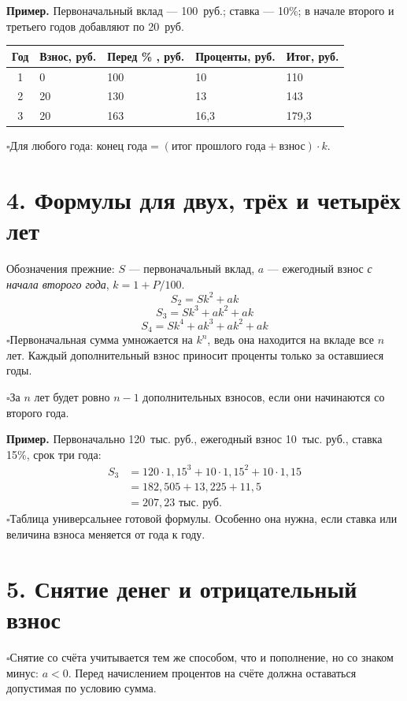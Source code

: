 \documentclass[a4paper,12pt]{article}
\newcommand{\checkitem}[1]{\noindent\(\square\)\enspace #1\par}
\newcommand{\smallrule}{\par\vspace{.15em}{\color{lightline}\rule{\linewidth}{.35pt}}\vspace{.15em}}
\begin{document}
\textbf{Пример.} Первоначальный вклад --- 100~руб.; ставка --- 10\%; в начале второго и третьего годов добавляют по 20~руб.
\begin{center}
\renewcommand{\arraystretch}{1.35}
\begin{tabularx}{\linewidth}{@{}cXXXX@{}}
\toprule
\textbf{Год} & \textbf{Взнос, руб.} & \textbf{Перед \% , руб.} & \textbf{Проценты, руб.} & \textbf{Итог, руб.}\\
\midrule
1 & 0 & 100 & 10 & 110\\
2 & 20 & 130 & 13 & 143\\
3 & 20 & 163 & 16{,}3 & 179{,}3\\
\bottomrule
\end{tabularx}
\end{center}
\checkitem{Для любого года: \(\text{конец года}=(\text{итог прошлого года}+\text{взнос})\cdot k\).}

\smallrule
\section*{4. Формулы для двух, трёх и четырёх лет}
Обозначения прежние: \(S\) --- первоначальный вклад, \(a\) --- ежегодный взнос \emph{с начала второго года}, \(k=1+P/100\).
\[
\boxed{S_2=Sk^2+ak}
\]
\[
\boxed{S_3=Sk^3+ak^2+ak}
\]
\[
\boxed{S_4=Sk^4+ak^3+ak^2+ak}
\]
\checkitem{Первоначальная сумма умножается на \(k^n\), ведь она находится на вкладе все \(n\) лет. Каждый дополнительный взнос приносит проценты только за оставшиеся годы.}
\checkitem{За \(n\) лет будет ровно \(n-1\) дополнительных взносов, если они начинаются со второго года.}

\textbf{Пример.} Первоначально 120~тыс. руб., ежегодный взнос 10~тыс. руб., ставка 15\%, срок три года:
\[
\begin{aligned}
S_3&=120\cdot1{,}15^3+10\cdot1{,}15^2+10\cdot1{,}15\\
&=182{,}505+13{,}225+11{,}5\\
&=\boxed{207{,}23\text{ тыс. руб.}}
\end{aligned}
\]
\checkitem{Таблица универсальнее готовой формулы. Особенно она нужна, если ставка или величина взноса меняется от года к году.}

\clearpage
\section*{5. Снятие денег и отрицательный взнос}
\checkitem{Снятие со счёта учитывается тем же способом, что и пополнение, но со знаком минус: \(a<0\). Перед начислением процентов на счёте должна оставаться допустимая по условию сумма.}
\end{document}
